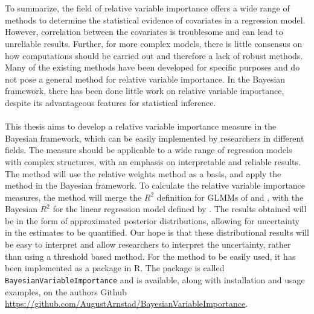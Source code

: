 \\
\\
To summarize, the field of relative variable importance offers a wide range of methods to determine the statistical evidence of covariates in a regression model. However, correlation between the covariates is troublesome and can lead to unreliable results. Further, for more complex models, there is little consensus on how computations should be carried out and therefore a lack of robust methods. Many of the existing methods have been developed for specific purposes and do not pose a general method for relative variable importance. In the Bayesian framework, there has been done little work on relative variable importance, despite its advantageous features for statistical inference.
\\
\\
This thesis aims to develop a relative variable importance measure in the Bayesian framework, which can be easily implemented by researchers in different fields. The measure should be applicable to a wide range of regression models with complex structures, with an emphasis on interpretable and reliable results. The method will use the relative weights method as a basis, and apply the method in the Bayesian framework. To calculate the relative variable importance measures, the method will merge the $R^2$ definition for GLMMs of \citep{nakagawa2013general} and \citep{nakagawa2017}, with the Bayesian $R^2$ for the linear regression model defined by \citet{gelman2017rsquared}. The results obtained will be in the form of approximated posterior distributions, allowing for uncertainty in the estimates to be quantified. Our hope is that these distributional results will be easy to interpret and allow researchers to interpret the uncertainty, rather than using a threshold based method. For the method to be easily used, it has been implemented as a package in R. The package is called \texttt{BayesianVariableImportance} and is available, along with installation and usage examples, on the authors Github \url{https://github.com/AugustArnstad/BayesianVariableImportance}. 
\\
\\
